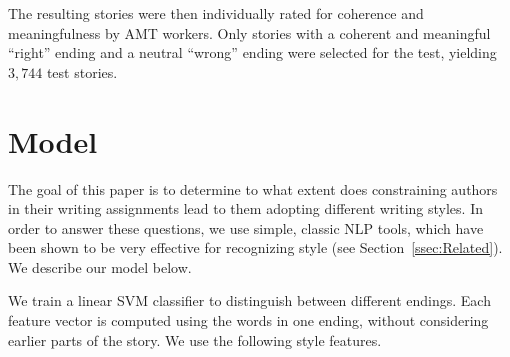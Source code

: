 \documentclass[11pt,a4paper]{article}
\newcommand{\secref}[1]{Section~\ref{ssec:#1}}
\newcommand{\isectionb}[1]{\section{#1}\label{ssec:#1}}
\newcommand{\ms}[1]{{\color{cyan}\{\textit{#1}\}$_{ms}$}}
\newcommand{\roy}[1]{\footnote{\color{red}{\textbf{Roy: #1}}}}
\renewcommand{\ms}[1]{}
\renewcommand{\roy}[1]{}
\begin{document}
The resulting stories were then individually rated for coherence and meaningfulness by AMT workers. Only stories with a coherent and meaningful ``right'' ending and a neutral ``wrong'' ending were selected for the test, yielding $3,744$ test stories. \ms{Hope the ``neutral'' thing makes sense, I didn't know how else to explain 4.2.2 of the Story cloze paper.}\roy{Reading 4.2.2, it seems that they were not targeting badly phrased ``wrong'' sentences, but just the stories as a whole, and validated that all ``right'' stories were valid and all ``wrong'' stories were invalid (unless this is how you read the -1 option in their description, which is not addressed anywhere else in the text). If I am correct, I would write this and explicitly mention that no validation was performed on the ending level.}

\roy{The following might belong in the related work section, but probably more relevant here: I would add a section about performance on this task, stating that the authors tried quite a few baselines and showed that all pretty much fail on the task, and other than that there was just one paper that got slightly better results.
This is a place to make two more arguments: 
(a) the low results obtained by the various baseline methods, as well as the low number of works (only one) that improved results on this task, compared to other similar tasks published in recent years (SQUAD, SNLI, CNN/Daily Mail., etc.), indicate that this is task is relatively hard, even for machine reading systems that has made a huge progress in recent years. 
(b) To the best of our knowledge, this is the first work to consider the style differences between the two endings, rather than the setup suggested by the author. \\
Btw, this could be a good place to mention the shared task.}

\isectionb{Model}

The goal of this paper is to determine to what extent does constraining authors in their writing assignments lead to them adopting different writing styles. 
In order to answer these questions, we use simple, classic NLP tools, which have been shown to be very effective for recognizing style (see \secref{Related}).
We describe our model below.

We train a linear SVM classifier to distinguish between different endings. 
Each feature vector is computed using the words in one ending, without considering earlier parts of the story. 
We use the following style features.
\end{document}
